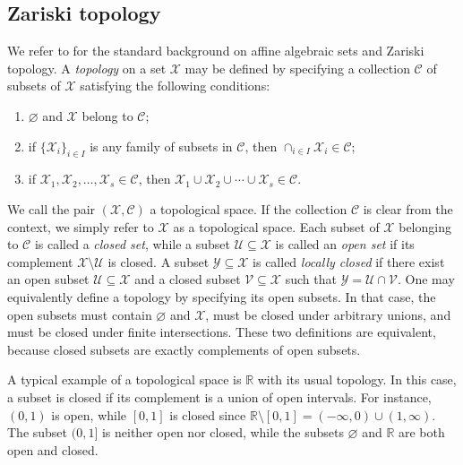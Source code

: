 \documentclass[a4,12pt]{amsart}
\numberwithin{equation}{section} %
\theoremstyle{definition} %
\begin{document}
\subsection{Zariski topology}\label{subsec::Zariski-topology}
We refer to \cite[Chapter I]{Hartshorne-book-1977} for the standard background on affine algebraic sets and Zariski topology. A \emph{topology} on a set $\mathcal{X}$ may be defined by specifying a collection $\mathcal{C}$ of subsets of $\mathcal{X}$ satisfying the following conditions: 
\begin{enumerate}
\item $\varnothing$ and $\mathcal{X}$ belong to $\mathcal{C}$; 

\item if $\{\mathcal{X}_i\}_{i\in I}$ is any family of subsets in $\mathcal{C}$, then $\cap_{i\in I}\mathcal{X}_i\in\mathcal{C}$; 

\item if $\mathcal{X}_1,\mathcal{X}_2,\ldots,\mathcal{X}_s\in\mathcal{C}$, then $\mathcal{X}_1\cup \mathcal{X}_2\cup\cdots\cup \mathcal{X}_s\in\mathcal{C}$. 
\end{enumerate}
We call the pair $(\mathcal{X},\mathcal{C})$ a topological space. If the collection $\mathcal{C}$ is clear from the context, we simply refer to $\mathcal{X}$ as a topological space. Each subset of $\mathcal{X}$ belonging to $\mathcal{C}$ is called a \emph{closed set}, while a subset $\mathcal{U}\subseteq \mathcal{X}$ is called an \emph{open set} if its complement $\mathcal{X}\setminus \mathcal{U}$ is closed. A subset $\mathcal{Y}\subseteq \mathcal{X}$ is called \emph{locally closed} if
there exist an open subset $\mathcal{U}\subseteq \mathcal{X}$ and a closed subset $\mathcal{V}\subseteq \mathcal{X}$ such that $\mathcal{Y}=\mathcal{U}\cap \mathcal{V}$. One may equivalently define a topology by specifying its open subsets. In that case, the open subsets must contain $\varnothing$ and $\mathcal{X}$, must be closed under arbitrary unions, and must be closed under finite intersections. These two definitions are equivalent, because closed subsets are exactly complements of open subsets. 

A typical example of a topological space is $\mathbb{R}$ with its usual topology. In this case, a subset is closed if its complement is a union of open intervals. For instance, $(0,1)$ is open, while $[0,1]$ is closed since $\mathbb{R}\setminus[0,1]=(-\infty,0)\cup(1,\infty)$. The subset $(0,1]$ is neither open nor closed, while the subsets $\varnothing$ and $\mathbb{R}$ are both open and closed. 
\end{document}
